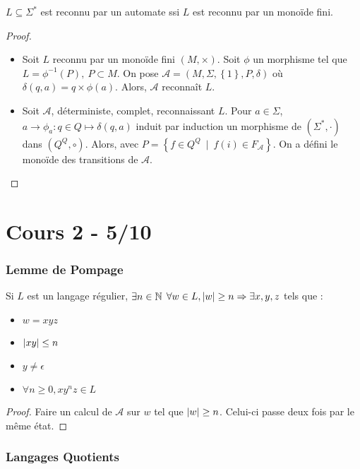 \documentclass{cours}
\begin{document}
\begin{proposition}
    $L\subseteq \Sigma^{*}$ est reconnu par un automate ssi $L$ est reconnu par un monoïde fini.
\end{proposition}
\begin{proof}
    \begin{itemize}
        \item Soit $L$ reconnu par un monoïde fini $(M, \times)$. Soit $\phi$ un morphisme tel que $L = \phi^{-1}(P), \ P\subset M$. On pose $\mathcal{A} = (M, \Sigma, \left\{1\right\}, P, \delta)$ où $\delta(q, a) = q \times \phi(a)$. Alors, $\mathcal{A}$ reconnaît $L$.
        \item Soit $\mathcal{A}$, déterministe, complet, reconnaissant $L$. Pour $a \in \Sigma$, $a \rightarrow \phi_{a} : q\in Q \mapsto \delta(q, a)$ induit par induction un morphisme de $(\Sigma^{*}, \cdot)$ dans $(Q^{Q}, \circ)$. Alors, avec $P = \left\{f \in Q^{Q}\ \mid \ f(i) \in F_{\mathcal{A}}\right\}$. On a défini le monoïde des transitions de $\mathcal{A}$.
    \end{itemize}
\end{proof}

\part{Cours 2 - 5/10}

\section{Lemme de Pompage}
\begin{theorem}
    Si $L$ est un langage régulier, $\exists n \in \mathbb{N}$ 
    $\forall w \in L, \left|w\right| \geq n \Rightarrow \exists x, y, z$ tels que : 
        \begin{itemize}
            \item $w = xyz$
            \item $\left|xy\right| \leq n$
            \item $y \neq \epsilon$
            \item $\forall n \geq 0, xy^{n}z \in L$
        \end{itemize}
\end{theorem}
\begin{proof}
    Faire un calcul de $\mathcal{A}$ sur $w$ tel que $\left|w\right| \geq n$. Celui-ci passe deux fois par le même état.
\end{proof}

\section{Langages Quotients}
\end{document}
